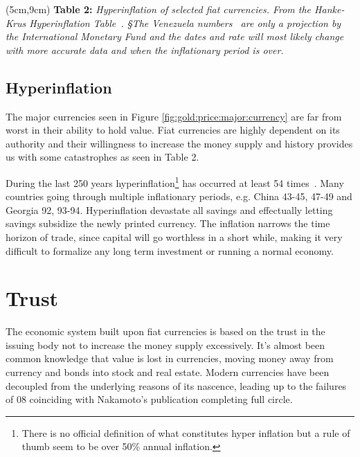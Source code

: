 \begin{textblock*}{11cm}(5cm,9cm)
\textbf{Table 2: }\textit{ 
	Hyperinflation of selected fiat currencies. From the Hanke-Krus Hyperinflation Table~\cite{hanke:krus:hyperinflation:table}. §The Venezuela numbers~\cite{hanke:hyperinflation} are only a projection by the International Monetary Fund and the dates and rate will most likely change with more accurate data and when the inflationary period is over.
}
\end{textblock*}

\vspace*{1.5cm}

\subsection{Hyperinflation}

The major currencies seen in Figure \ref{fig:gold:price:major:currency} are far from worst in their ability to hold value. Fiat currencies are highly dependent on its authority and their willingness to increase the money supply and history provides us with some catastrophes as seen in Table 2.

During the last 250 years hyperinflation\footnote{There is no official definition of what constitutes hyper inflation but a rule of thumb seem to be over 50\% annual inflation.} has occurred at least 54 times~\cite{hanke:krus:hyperinflation:table, hanke:hyperinflation}. Many countries going through multiple inflationary periods, e.g. China 43-45, 47-49 and Georgia 92, 93-94. Hyperinflation devastate all savings and effectually letting savings subsidize the newly printed currency. The inflation narrows the time horizon of trade, since capital will go worthless in a short while, making it very difficult to formalize any long term investment or running a normal economy. 

\section{Trust}

The economic system built upon fiat currencies is based on the trust in the issuing body not to increase the money supply excessively. It's almost been common knowledge that value is lost in currencies, moving money away from currency and bonds into stock and real estate. Modern currencies have been decoupled from the underlying reasons of its nascence, leading up to the failures of 08 coinciding with Nakamoto's publication completing full circle.


